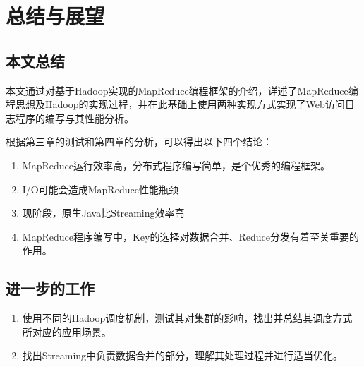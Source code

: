 \chapter{总结与展望}
\label{chap:5}

\section{本文总结}
本文通过对基于Hadoop实现的MapReduce编程框架的介绍，详述了MapReduce编程思想及Hadoop的实现过程，并在此基础上使用两种实现方式实现了Web访问日志程序的编写与其性能分析。

根据第三章的测试和第四章的分析，可以得出以下四个结论：

\begin{enumerate}
\item MapReduce运行效率高，分布式程序编写简单，是个优秀的编程框架。
\item I/O可能会造成MapReduce性能瓶颈
\item 现阶段，原生Java比Streaming效率高
\item MapReduce程序编写中，Key的选择对数据合并、Reduce分发有着至关重要的作用。
\end{enumerate}

\section{进一步的工作}



\begin{enumerate}
\item 使用不同的Hadoop调度机制，测试其对集群的影响，找出并总结其调度方式所对应的应用场景。
\item 找出Streaming中负责数据合并的部分，理解其处理过程并进行适当优化。
\end{enumerate}

